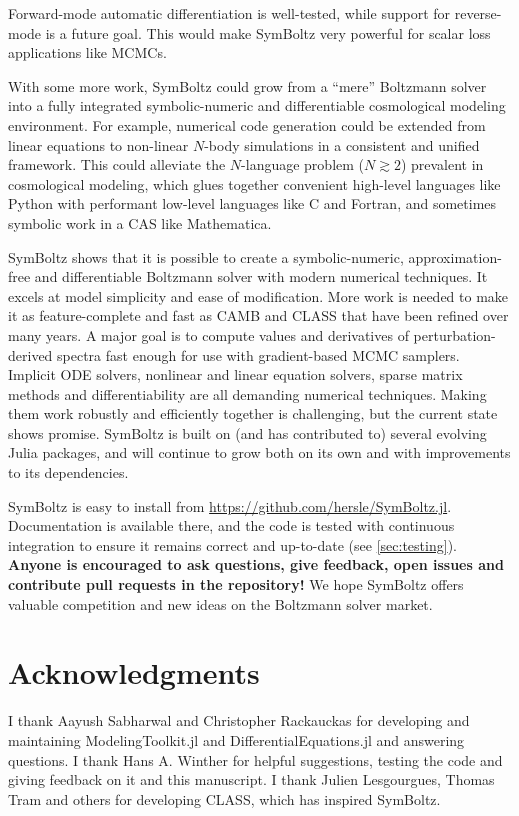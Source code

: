\documentclass{aa}
\begin{document}
Forward-mode automatic differentiation is well-tested, while support for reverse-mode is a future goal.
This would make SymBoltz very powerful for scalar loss applications like MCMCs.

With some more work, SymBoltz could grow from a \enquote{mere} Boltzmann solver into a fully integrated symbolic-numeric and differentiable cosmological modeling environment.
For example, numerical code generation could be extended from linear equations to non-linear $N$-body simulations in a consistent and unified framework.
This could alleviate the $N$-language problem ($N \gtrsim 2$) prevalent in cosmological modeling, which glues together convenient high-level languages like Python with performant low-level languages like C and Fortran, and sometimes symbolic work in a CAS like Mathematica.

SymBoltz shows that it is possible to create a symbolic-numeric, approximation-free and differentiable Boltzmann solver with modern numerical techniques.
It excels at model simplicity and ease of modification.
More work is needed to make it as feature-complete and fast as CAMB and CLASS that have been refined over many years.
A major goal is to compute values and derivatives of perturbation-derived spectra fast enough for use with gradient-based MCMC samplers.
Implicit ODE solvers, nonlinear and linear equation solvers, sparse matrix methods and differentiability are all demanding numerical techniques.
Making them work robustly and efficiently together is challenging, but the current state shows promise.
SymBoltz is built on (and has contributed to) several evolving Julia packages, and will continue to grow both on its own and with improvements to its dependencies.

SymBoltz is easy to install from \url{https://github.com/hersle/SymBoltz.jl}.
Documentation is available there, and the code is tested with continuous integration to ensure it remains correct and up-to-date (see \cref{sec:testing}).
\textbf{Anyone is encouraged to ask questions, give feedback, open issues and contribute pull requests in the repository!}
We hope SymBoltz offers valuable competition and new ideas on the Boltzmann solver market.

\section*{Acknowledgments}

I thank Aayush Sabharwal and Christopher Rackauckas for developing and maintaining ModelingToolkit.jl and DifferentialEquations.jl and answering questions.
I thank Hans A. Winther for helpful suggestions, testing the code and giving feedback on it and this manuscript.
I thank Julien Lesgourgues, Thomas Tram and others for developing CLASS, which has inspired SymBoltz.
\end{document}

